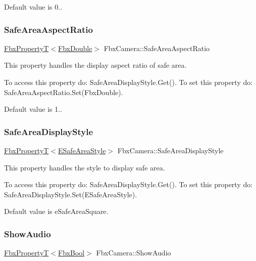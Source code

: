Default value is 0.. \mbox{\label{class_fbx_camera_aeb22ecb7b5a1551e735e9cf222d79b6d}} 
\subsubsection{\texorpdfstring{Safe\+Area\+Aspect\+Ratio}{SafeAreaAspectRatio}}
{\footnotesize\ttfamily \hyperlink{class_fbx_property_t}{Fbx\+PropertyT}$<$\hyperlink{fbxtypes_8h_a171e72a1c46fc15c1a6c9c31948c1c5b}{Fbx\+Double}$>$ Fbx\+Camera\+::\+Safe\+Area\+Aspect\+Ratio}

This property handles the display aspect ratio of safe area.

To access this property do\+: Safe\+Area\+Display\+Style.\+Get(). To set this property do\+: Safe\+Area\+Aspect\+Ratio.\+Set(\+Fbx\+Double).

Default value is 1.. \mbox{\label{class_fbx_camera_a48f27fb4b475f1ee7d2ace77cc860ad3}} 
\subsubsection{\texorpdfstring{Safe\+Area\+Display\+Style}{SafeAreaDisplayStyle}}
{\footnotesize\ttfamily \hyperlink{class_fbx_property_t}{Fbx\+PropertyT}$<$\hyperlink{class_fbx_camera_aa9fb36da95d392ac56ff2d8b44171210}{E\+Safe\+Area\+Style}$>$ Fbx\+Camera\+::\+Safe\+Area\+Display\+Style}

This property handles the style to display safe area.

To access this property do\+: Safe\+Area\+Display\+Style.\+Get(). To set this property do\+: Safe\+Area\+Display\+Style.\+Set(\+E\+Safe\+Area\+Style).

Default value is e\+Safe\+Area\+Square. \mbox{\label{class_fbx_camera_ad2c18755bf884d3ce15566dc90cc3d97}} 
\subsubsection{\texorpdfstring{Show\+Audio}{ShowAudio}}
{\footnotesize\ttfamily \hyperlink{class_fbx_property_t}{Fbx\+PropertyT}$<$\hyperlink{fbxtypes_8h_a92e0562b2fe33e76a242f498b362262e}{Fbx\+Bool}$>$ Fbx\+Camera\+::\+Show\+Audio}

